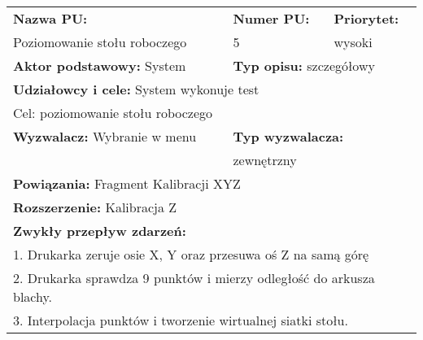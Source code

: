 \documentclass{article}
\begin{document}
\begin{enumerate}[label=\arabic*.]
\begin{tabular}{|p{5cm}|p{3cm}|p{3cm}|p{3cm}|p{}|p{3cm}|}
\end{tabular}
\newpage
\begin{tabular}{|p{5cm}|p{3cm}|p{3cm}|p{3cm}|p{}|p{3cm}|}
\hline
\multicolumn{4}{|l|}{\textbf{Nazwa PU:}} & \multicolumn{1}{l|}{\textbf{Numer PU:}} & \multicolumn{1}{|l|}{\textbf{Priorytet:} } \\ 
\multicolumn{4}{|l|}{Poziomowanie stołu roboczego} & \multicolumn{1}{l|}{5} & \multicolumn{1}{|l|}{wysoki}\\ \hline
\multicolumn{3}{|l|}{\textbf{Aktor podstawowy:} System} & \multicolumn{3}{l|}{\textbf{Typ opisu:} szczegółowy} \\ \hline
\multicolumn{6}{|l|}{\textbf{Udziałowcy i cele:} System wykonuje test} \\ 
\multicolumn{6}{|l|}{Cel: poziomowanie stołu roboczego} \\ \hline
\multicolumn{3}{|l|}{\textbf{Wyzwalacz:} Wybranie w menu} & \multicolumn{3}{l|}{\textbf{Typ wyzwalacza:}} \\ 
\multicolumn{3}{|l|}{} & \multicolumn{3}{l|}{zewnętrzny} \\ \hline
\multicolumn{6}{|l|}{\textbf{Powiązania:} Fragment Kalibracji XYZ} \\
\multicolumn{6}{|l|}{\textbf{Rozszerzenie:} Kalibracja Z} \\
\hline
\multicolumn{6}{|l|}{\textbf{Zwykły przepływ zdarzeń:}} \\
\multicolumn{6}{|l|}{1. Drukarka zeruje osie X, Y oraz przesuwa oś Z na samą górę} \\
\multicolumn{6}{|l|}{2. Drukarka sprawdza 9 punktów i mierzy odległość do arkusza blachy.} \\
\multicolumn{6}{|l|}{3. Interpolacja punktów i tworzenie wirtualnej siatki stołu.} \\
\hline

\end{tabular}


\end{enumerate}
\end{document}
